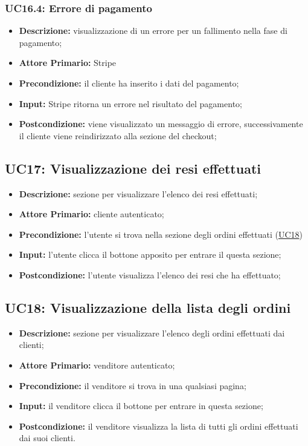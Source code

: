             \subsubsection{UC16.4: Errore di pagamento}
            \label{sec:UC16.4}
                \begin{itemize}
                    \item \textbf{Descrizione:} visualizzazione di un errore per un fallimento nella fase di pagamento;
                    \item \textbf{Attore Primario:} Stripe
                    \item \textbf{Precondizione:} il cliente ha inserito i dati del pagamento;
                    \item \textbf{Input:} Stripe ritorna un errore nel risultato del pagamento;
                    \item \textbf{Postcondizione:} viene visualizzato un messaggio di errore, successivamente il cliente viene reindirizzato alla sezione del checkout;
                \end{itemize}


        \subsection{UC17: Visualizzazione dei resi effettuati}
            \begin{itemize}
                \item \textbf{Descrizione:} sezione per visualizzare l'elenco dei resi effettuati;
                \item \textbf{Attore Primario:} cliente autenticato;
                \item \textbf{Precondizione:} l'utente si trova nella sezione degli ordini effettuati (\hyperref[sec:UC18]{UC18})
                \item \textbf{Input:} l'utente clicca il bottone apposito per entrare il questa sezione;
                \item \textbf{Postcondizione:} l'utente visualizza l'elenco dei resi che ha effettuato;
            \end{itemize}


        \subsection{UC18: Visualizzazione della lista degli ordini}
        \label{sec:UC18}
        \begin{itemize}
            \item \textbf{Descrizione:} sezione per visualizzare l'elenco degli ordini effettuati dai clienti;
            \item \textbf{Attore Primario:} venditore autenticato; 
            \item \textbf{Precondizione:} il venditore si trova in una qualsiasi pagina;
            \item \textbf{Input:} il venditore clicca il bottone per entrare in questa sezione; 
            \item \textbf{Postcondizione:} il venditore visualizza la lista di tutti gli ordini effettuati dai suoi clienti.
        \end{itemize}


